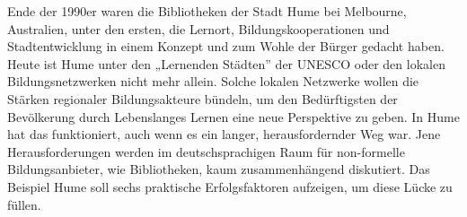 Ende der 1990er waren die Bibliotheken der Stadt Hume bei Melbourne,
Australien, unter den ersten, die Lernort, Bildungskooperationen und
Stadtentwicklung in einem Konzept und zum Wohle der Bürger gedacht
haben. Heute ist Hume unter den „Lernenden Städten'' der UNESCO oder den
lokalen Bildungsnetzwerken nicht mehr allein. Solche lokalen Netzwerke
wollen die Stärken regionaler Bildungsakteure bündeln, um den
Bedürftigsten der Bevölkerung durch Lebenslanges Lernen eine neue
Perspektive zu geben. In Hume hat das funktioniert, auch wenn es ein
langer, herausfordernder Weg war. Jene Herausforderungen werden im
deutschsprachigen Raum für non-formelle Bildungsanbieter, wie
Bibliotheken, kaum zusammenhängend diskutiert. Das Beispiel Hume soll
sechs praktische Erfolgsfaktoren aufzeigen, um diese Lücke zu füllen.
